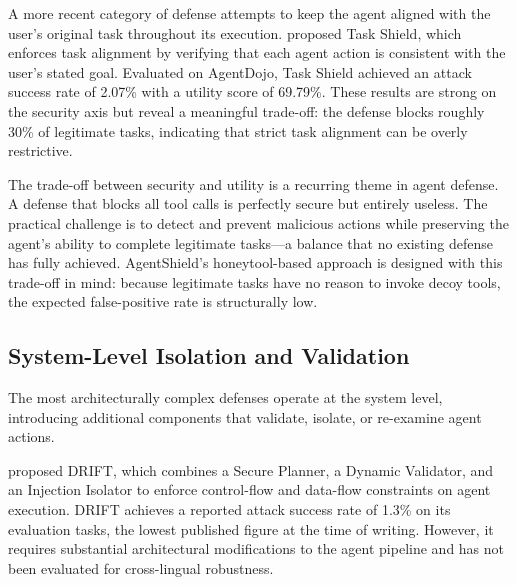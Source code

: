 \begin{justify}
A more recent category of defense attempts to keep the agent aligned with the user's original task throughout its execution.  \cite{kim2024taskshield} proposed Task Shield, which enforces task alignment by verifying that each agent action is consistent with the user's stated goal.  Evaluated on AgentDojo, Task Shield achieved an attack success rate of 2.07\% with a utility score of 69.79\%.  These results are strong on the security axis but reveal a meaningful trade-off: the defense blocks roughly 30\% of legitimate tasks, indicating that strict task alignment can be overly restrictive.
\end{justify}

\begin{justify}
The trade-off between security and utility is a recurring theme in agent defense.  A defense that blocks all tool calls is perfectly secure but entirely useless.  The practical challenge is to detect and prevent malicious actions while preserving the agent's ability to complete legitimate tasks---a balance that no existing defense has fully achieved.  AgentShield's honeytool-based approach is designed with this trade-off in mind: because legitimate tasks have no reason to invoke decoy tools, the expected false-positive rate is structurally low.
\end{justify}

\subsection{System-Level Isolation and Validation}

\begin{justify}
The most architecturally complex defenses operate at the system level, introducing additional components that validate, isolate, or re-examine agent actions.
\end{justify}

\begin{justify}
\cite{liao2025drift} proposed DRIFT, which combines a Secure Planner, a Dynamic Validator, and an Injection Isolator to enforce control-flow and data-flow constraints on agent execution.  DRIFT achieves a reported attack success rate of 1.3\% on its evaluation tasks, the lowest published figure at the time of writing.  However, it requires substantial architectural modifications to the agent pipeline and has not been evaluated for cross-lingual robustness.
\end{justify}

